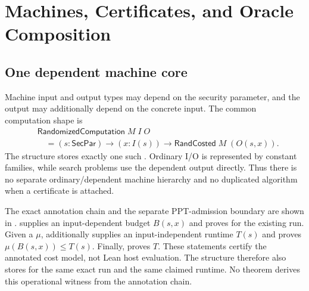 \section{Machines, Certificates, and Oracle Composition}
\label{sec:machines-oracles}

\subsection{One dependent machine core}

Machine input and output types may depend on the security parameter, and the
output may additionally depend on the concrete input.  The common computation
shape is
\[
  \begin{aligned}
    &\mathsf{RandomizedComputation}\;M\;I\;O \\
    &\quad= (s : \mathsf{SecPar}) \to (x : I(s)) \to
      \mathsf{RandCosted}\;M\;(O(s,x)).
  \end{aligned}
\]
The structure  stores exactly one such
.  Ordinary I/O is represented by constant families, while search
problems use the dependent output directly.  Thus there is no separate
ordinary/dependent machine hierarchy and no duplicated algorithm when a
certificate is attached.

The exact annotation chain and the separate PPT-admission boundary are shown
in .
 supplies an input-dependent budget
\(B(s,x)\) and proves  for the existing run.
Given a  \(\mu\),  additionally
supplies an input-independent runtime \(T(s)\) and proves
\(\mu(B(s,x))\leq T(s)\).  Finally,  proves
 \(T\).  These statements certify the annotated cost model,
not Lean host evaluation.  The structure  therefore also
stores  for the same exact run and the same claimed runtime.
No theorem derives this operational witness from the annotation chain.

